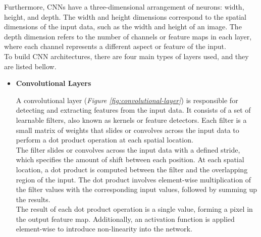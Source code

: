 Furthermore, CNNs have a three-dimensional arrangement of neurons: width, height, and depth. The width and height dimensions correspond to the spatial dimensions of the input data, such as the width and height of an image. The depth dimension refers to the number of channels or feature maps in each layer, where each channel represents a different aspect or feature of the input. \\

To build CNN architectures, there are four main types of layers used, and they are listed bellow. \\

\begin{itemize}
  \item \textbf{Convolutional Layers}

    A convolutional layer (\textit{Figure \ref{fig:convolutional-layer}}) is responsible for detecting and extracting features from the input data. It consists of a set of learnable filters, also known as kernels or feature detectors. Each filter is a small matrix of weights that slides or convolves across the input data to perform a dot product operation at each spatial location.  \\

The filter slides or convolves across the input data with a defined stride, which specifies the amount of shift between each position.
At each spatial location, a dot product is computed between the filter and the overlapping region of the input.
The dot product involves element-wise multiplication of the filter values with the corresponding input values, followed by summing up the results. \\

The result of each dot product operation is a single value, forming a pixel in the output feature map. Additionally, an activation function is applied element-wise to introduce non-linearity into the network. \\

\newpage


\end{itemize}
